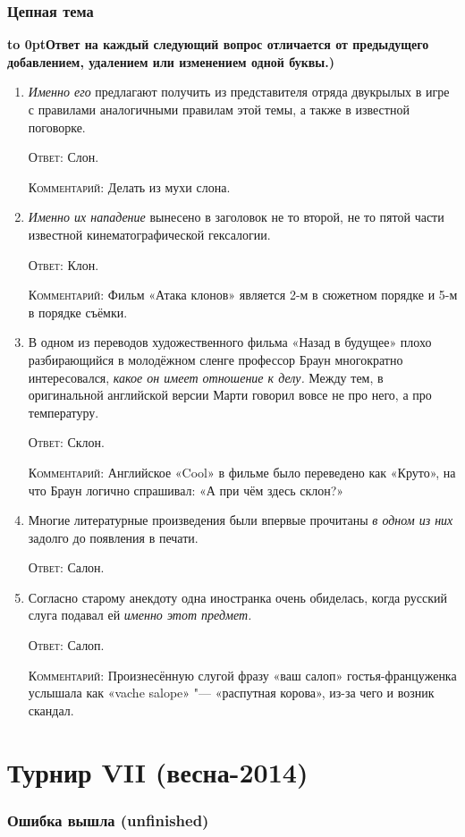 \documentclass[a4paper,10pt]{article}
\let\keyword\textsc
\newenvironment{topic}{\begin{enumerate}}{\end{enumerate}}
\newcommand{\question}[3]{\item[#1.] #2 \par \keyword{Ответ:} #3}
\newcommand{\commentary}[1]{\par \keyword{Комментарий:} #1}
\newcommand{\topiccommentary}[1]{\begin{adjustwidth}{0.9cm}{} \vspace{-0.3em}\textbf{\hbox to 0pt{\hss{(}}#1)} \end{adjustwidth}}
\begin{document}
\section{Цепная тема}
\topiccommentary{Ответ на каждый следующий вопрос отличается от предыдущего добавлением, удалением или изменением одной буквы.}

\begin{topic}
 \question{10}{\emph{Именно его} предлагают получить из представителя отряда двукрылых в игре с правилами аналогичными правилам этой темы, а также в известной поговорке.}{Слон.}\commentary{Делать из мухи слона.}
 \question{20}{\emph{Именно их нападение} вынесено в заголовок не то второй, не то пятой части известной кинематографической гексалогии.}{Клон.}\commentary{Фильм «Атака клонов» является 2-м в сюжетном порядке и 5-м в порядке съёмки.}
 \question{30}{В одном из переводов художественного фильма «Назад в будущее» плохо разбирающийся в молодёжном сленге профессор Браун многократно интересовался, \emph{какое он имеет отношение к делу.} Между тем, в оригинальной английской версии Марти говорил вовсе не про него, а про температуру.}{Склон.}\commentary{Английское «Cool» в фильме было переведено как «Круто», на что Браун логично спрашивал: «А при чём здесь склон?»}
 \question{40}{Многие литературные произведения были впервые прочитаны \emph{в одном из них} задолго до появления в печати.}{Салон.}
 \question{50}{Согласно старому анекдоту одна иностранка очень обиделась, когда русский слуга подавал ей \emph{именно этот предмет.}}{Салоп.}\commentary{Произнесённую слугой фразу «ваш салоп» гостья-француженка услышала как «vache salope» "--- «распутная корова», из-за чего и возник скандал.}
\end{topic}


\newpage
\part{Турнир VII (весна-2014)}

\section{Ошибка вышла (unfinished)}
\end{document}
